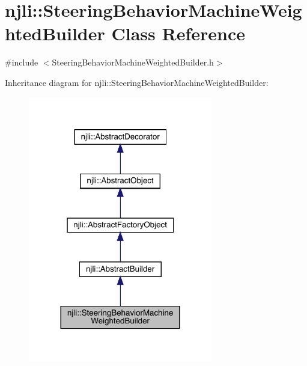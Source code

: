 \hypertarget{classnjli_1_1_steering_behavior_machine_weighted_builder}{}\section{njli\+:\+:Steering\+Behavior\+Machine\+Weighted\+Builder Class Reference}
\label{classnjli_1_1_steering_behavior_machine_weighted_builder}


{\ttfamily \#include $<$Steering\+Behavior\+Machine\+Weighted\+Builder.\+h$>$}



Inheritance diagram for njli\+:\+:Steering\+Behavior\+Machine\+Weighted\+Builder\+:\nopagebreak
\begin{figure}[H]
\begin{center}
\leavevmode
\includegraphics[width=228pt]{classnjli_1_1_steering_behavior_machine_weighted_builder__inherit__graph}
\end{center}
\end{figure}


